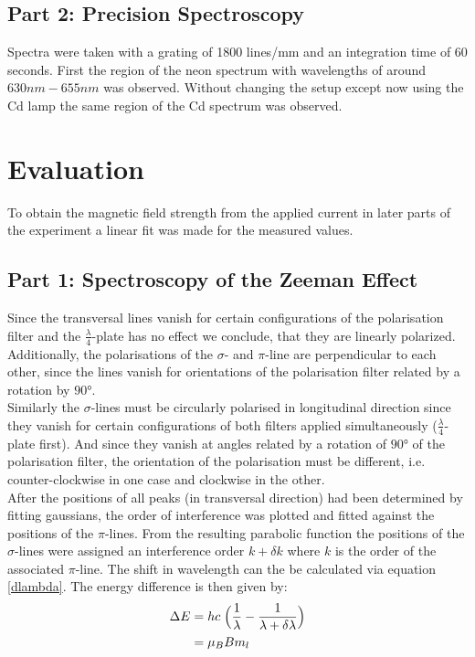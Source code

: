 \documentclass[12pt]{article}
\begin{document}
\subsection{Part 2: Precision Spectroscopy}
Spectra were taken with a grating of 1800 lines/mm and an integration time of 60 seconds. First the region of the neon spectrum with wavelengths of around $630nm-655nm$ was observed. Without changing the setup except now using the Cd lamp the same region of the Cd spectrum was observed. 
\section{Evaluation}
	To obtain the magnetic field strength from the applied current in later parts of the experiment a linear fit was made for the measured values.
\subsection{Part 1: Spectroscopy of the Zeeman Effect}
	Since the transversal lines vanish for certain configurations of the polarisation filter and the $\frac{\lambda}{4}$-plate has no effect we conclude, that they are linearly polarized. Additionally, the polarisations of the $\sigma$- and $\pi$-line are perpendicular to each other, since the lines vanish for orientations of the polarisation filter related by a rotation by $\ang{90}$.\\
	Similarly the $\sigma$-lines must be circularly polarised in longitudinal direction since they vanish for certain configurations of both filters applied simultaneously ($\frac{\lambda}{4}$-plate first). And since they vanish at angles related by a rotation of $\ang{90}$ of the polarisation filter, the orientation of the polarisation must be different, i.e. counter-clockwise in one case and clockwise in the other.\\
	After the positions of all peaks (in transversal direction) had been determined by fitting gaussians, the order of interference was plotted and fitted against the positions of the $\pi$-lines. From the resulting parabolic function the positions of the $\sigma$-lines were assigned an interference order $k+\delta k$ where $k$ is the order of the associated $\pi$-line. The shift in wavelength can the be calculated via equation \ref{dlambda}. The energy difference is then given by:
	\begin{align}
		\Delta E&=hc\;\Bigl(\frac{1}{\lambda}-\frac{1}{\lambda+\delta \lambda} \Bigr) 
		\label{dE1}\\
		&=\mu_BBm_l
		\label{dE2}
	\end{align}
\end{document}
